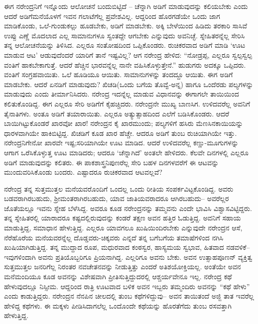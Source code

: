 ಈಗ ನರೇಂದ್ರನಿಗೆ ಇನ್ನೊಂದು ಆಲೋಚನೆ ಬಂದುಬಿಟ್ಟಿದೆ – ಚೆನ್ನಾಗಿ ಅಡಿಗೆ ಮಾಡುವುದನ್ನು ಕಲಿಯಬೇಕು ಎಂದು ಆದರೆ ಅಡಿಗೆಮನೆಯೊಳಗೆ ಇವನ ಗಲಾಟೆಗೆಲ್ಲ ಪ್ರವೇಶವಿಲ್ಲ. ಆದ್ದರಿಂದ ಹೊರಗಡೆಯೇ ಒಂದು ಜಾಗ ಮಾಡಿಕೊಂಡು, ಒಲೆ-ಗುಂಡುಕಲ್ಲು ಹೂಡಬೇಕು, ಅಡಿಗೆ ಮಾಡಬೇಕು. ಅಕ್ಕಿ ಬೇಳೆಯಿಂದ ಹಿಡಿದು ತರಕಾರಿ ಸಾಸಿವೆ ಉಪ್ಪು ಎಣ್ಣೆ ಮೊದಲಾದ ಎಲ್ಲ ಸಾಮಾನುಗಳೂ ಸ್ವಂತದ್ದೇ ಆಗಬೇಕು ಎನ್ನುವುದು ಅವನಿಚ್ಛೆ. ಸ್ನೇಹಿತರನ್ನೆಲ್ಲ ಸೇರಿಸಿ ತನ್ನ ಆಲೋಚನೆಯನ್ನು ತಿಳಿಸಿದ. ಎಲ್ಲರೂ ಸಂತೋಷದಿಂದ ಒಪ್ಪಿಕೊಂಡರು. ರುಚಿಕರವಾದ ಅಡಿಗೆ ಮಾಡಿ ‘ಊಟ ಮಾಡುವ ಆಟ’ ಆಡುವುದೆಂದರೆ ಯಾರಿಗೆ ತಾನೆ ಇಷ್ಟವಿಲ್ಲ? ಆಗ ನರೇಂದ್ರ ಹೇಳಿದ: “ನೋಡ್ರಪ್ಪ, ಎಲ್ಲರೂ ಸ್ವಲ್ಪಸ್ವಲ್ಪ ವಂತಿಗೆ ಹಾಕಬೇಕಾಗುತ್ತೆ. ಆದರೆ ಹೆಚ್ಚಿನ ಭಾರವನ್ನೆಲ್ಲ ನಾನೇ ವಹಿಸಿಕೊಳ್ಳುತ್ತೇನೆ.” ಹುಡುಗರು ಅದಕ್ಕೂ ಒಪ್ಪಿದರು. ವಂತಿಗೆ ಸಂಗ್ರಹವಾಯಿತು. ಒಲೆ ಹೂಡಿಯೂ ಆಯಿತು. ಸಾಮಾನುಗಳನ್ನು ತಂದದ್ದೂ ಆಯಿತು. ಈಗ ಅಡಿಗೆ ಮಾಡಬೇಕು. ಆದರೆ ಏನಡಿಗೆ ಮಾಡುವುದು? ಖಿಚಡಿ(ಒಂದು ಬಗೆಯ ತೊವ್ವೆ-ಅನ್ನ) ಹಾಗೂ ಒಂದೆರಡು ಪಲ್ಯಗಳನ್ನು ಮಾಡುವುದು ಎಂದು ತೀರ್ಮಾನಿಸಿದರು. ನರೇಂದ್ರ ಇದನ್ನೆಲ್ಲ ಮಾಡುವ ವಿಧಾನವನ್ನು ಈಗಾಗಲೇ ತಾಯಿಯಿಂದ ಕಲಿತುಕೊಂಡಿದ್ದ. ಈಗ ಎಲ್ಲರೂ ಸೇರಿ ಅಡಿಗೆಗೆ ಕೈಹಚ್ಚಿದರು. ನರೇಂದ್ರನೇ ಮುಖ್ಯ ಬಾಣಸಿಗ. ಉಳಿದವರೆಲ್ಲ ಅವನಿಗೆ ತೈನಾತಿಗಳು. ಅಂತೂ ಅಡಿಗೆ ತಯಾರಾಯಿತು. ಎಲ್ಲರೂ ಅತ್ಯುತ್ಸಾಹದಿಂದ ಎಲೆಗೆ ಬಡಿಸಿಕೊಂಡರು. ಆದರೆ ಬಾಯಿಗಿಟ್ಟುಕೊಂಡರೆ ಖಾರವೋ ಖಾರ! ನರೇಂದ್ರನ ಕೈ ಖಾರಮುಂದು; ಪಲ್ಯಗಳಿಗೆ ಹಸಿರು ಮೆಣಸಿನಕಾಯಿಯನ್ನು ಧಾರಳವಾಗಿಯೇ ಹಾಕಿಬಿಟ್ಟಿದ್ದ. ಖಿಚಡಿಗೆ ಕೂಡ ಖಾರ ಹೆಚ್ಚೇ. ಆದರೂ ಅಡಿಗೆ ತುಂಬ ರುಚಿಯಾಗಿಯೇ ಇತ್ತು. ನರೇಂದ್ರನಿಗೇನೋ ಖಾರವೇ ಇಷ್ಟ;ಸರಿಯಾಗಿಯೇ ಊಟ ಮಾಡಿದ. ಆದರೆ ಉಳಿದವರೆಲ್ಲ ಕಣ್ಣು-ಮೂಗುಗಳನ್ನು ಆಗಾಗ ಒರೆಸಿಕೊಳ್ಳುತ್ತ ಊಟ ಮಾಡಿದರು; ಆದರೂ ‘ಚೆನ್ನಾಗಿದೆ’ ಅಂತಲೇ ಹೇಳಿದರು. ಕೆಲವೇ ದಿನಗಳಲ್ಲಿ ಎಲ್ಲರೂ ಅಡಿಗೆ ಮಾಡುವುದನ್ನು ಕಲಿತರು. ಈ ಪಾಕಶಾಸ್ತ್ರನಿಪುಣರೆಲ್ಲ ಸೇರಿ ಬಹಳ ದಿನಗಳವರೆಗೆ ಈ ಆಟವನ್ನು ಮುಂದುವರಿಸಿಕೊಂಡು ಬಂದರು. ಎಷ್ಟಾದರೂ ರುಚಿಕರವಾದ ಆಟವಲ್ಲವೆ? 

ನರೇಂದ್ರ ತನ್ನ ಸುತ್ತಮುತ್ತಲ ಮನೆಯವರೊಂದಿಗೆ ಒಂದಲ್ಲ ಒಂದು ರೀತಿಯ ಸಂಪರ್ಕವಿಟ್ಟಕೊಂಡಿದ್ದ. ಅವರು ಬಡವರಾಗಿರಬಹುದು, ಶ್ರೀಮಂತರಾಗಿರಬಹುದು, ಯಾವ ಜಾತಿಯವರಾದರೂ ಆಗಿರಬಹುದು– ಅವರೆಲ್ಲರ ಜೊತೆಯಲ್ಲೂ ಇವನು ಸ್ನೇಹ ಬೆಳೆಸಿದ್ದ. ಅವರೂ ಕೂಡ ನರೇಂದ್ರನನ್ನು ತಮ್ಮವನು ಎಂದೇ ಭಾವಿಸಿ ವಿಶ್ವಾಸವಿಟ್ಟಿದ್ದರು. ತನ್ನ ಸ್ನೇಹಿತರಲ್ಲಿ ಯಾರಾದರೂ ಕಷ್ಟದಲ್ಲಿರುವುದನ್ನು ಕಂಡರೆ ತಕ್ಷಣ ಅವನ ಹತ್ತಿರ ಓಡುತ್ತಿದ್ದ. ಅವನಿಗೆ ಸಹಾಯ ಮಾಡುತ್ತಿದ್ದ, ಸಮಾಧಾನ ಹೇಳುತ್ತಿದ್ದ. ಎಲ್ಲರೂ ಯಾವಗಲೂ ಖುಷಿಯಿಂದಿರಬೇಕು ಎನ್ನುವುದೇ ನರೇಂದ್ರನ ಆಸೆ, ನೆರೆಹೊರೆಯ ಮನೆಯವರನ್ನೆಲ್ಲ ದೊಡ್ಡವರು-ಚಿಕ್ಕವರು ಎನ್ನದೆ ತನ್ನ ಬಗೆಬಗೆಯ ತಮಾಷೆಗಳಿಂದ ನಗಿಸಿ ಖುಷಿಯಾಗಿಡುತ್ತಿದ್ದ. ತನ್ನ ಮುದ್ದಾದ ರೂಪ, ಮಧುರವಾದ ಕಂಠಸ್ವರ, ಹಾಸ್ಯಮಯ ಸ್ವಭಾವ, ಹಿತವಾದ ನಡವಳಿಕೆ– ಇವುಗಳಿಂದಾಗಿ ಅವನು ಪ್ರತಿಯೊಬ್ಬರಿಗೂ ಪ್ರಿಯನಾಗಿದ್ದ. ಎಲ್ಲರಿಗೂ ಅವನು ಬೇಕು. ಅವನ ಉತ್ಸಾಹಪೂಣನ್ ವ್ಯಕ್ತಿತ್ವ ಸುತ್ತಮುತ್ತಲ ಜನರಿಗೆಲ್ಲ ನಿರಂತರ ನವಚೇತನವನ್ನು ನೀಡುತ್ತಿತ್ತು ಎಂದರೆ ಅತಿಶಯೋಕ್ತಿಯಲ್ಲ. ಅಂತೆಯೇ ಅವನ ಮನೆಮಂದಿಯೂ ಕೂಡ ಅವನನ್ನು ವಿಶೇಷವಾಗಿ ಪ್ರೀತಿಸುತ್ತಿದ್ದುದರಲ್ಲಿ ಆಶ್ಚರ್ಯವೇನೂ ಇಲ್ಲ. ನರೇಂದ್ರ ಕಥೆ ಹೇಳುವುದಲ್ಲೂ ನಿಸ್ಸೀಮ. ಆದ್ದರಿಂದ ರಾತ್ರಿ ಊಟವಾದ ಬಳಿಕ ಅವನ ಇಬ್ಬರು ತಮ್ಮಂದಿರು ಅವನನ್ನು “ಕಥೆ ಹೇಳು” ಎಂದು ಕಾಡುತ್ತಿದ್ದರು. ನರೇಂದ್ರನ ನೆನಪಿನ ಚೀಲದಲ್ಲಿ ತುಂಬ ಕಥೆಗಳಿದ್ದುವು– ಅವನ ತಾಯಿತಂದೆ ಅಜ್ಜಿ ತಾತ ಇವರೆಲ್ಲ ಹೇಳಿದ್ದ ಕಥೆಗಳು. ಈ ಮಕ್ಕಳು ಪೀಡಿಸಿದಾಗಲೆಲ್ಲ ಒಂದೊಂದೇ ಕಥೆಯನ್ನು ಹೊರತೆಗೆದು ತುಂಬ ರಸವತ್ತಾಗಿ ಹೇಳುತ್ತಿದ್ದ.

